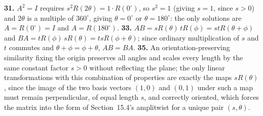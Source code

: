 \quad
\textbf{31.} $A^2=I$ requires $s^2R(2\theta) = 1\cdot R(0^\circ)$, so
$s^2=1$ (giving $s=1$, since $s>0$) and $2\theta$ is a multiple of
$360^\circ$, giving $\theta=0^\circ$ or $\theta=180^\circ$: the only
solutions are $A=R(0^\circ)=I$ and $A=R(180^\circ)$. \quad
\textbf{33.} $AB = sR(\theta)\,tR(\phi) = stR(\theta+\phi)$ and $BA =
tR(\phi)\,sR(\theta) = tsR(\phi+\theta)$; since ordinary multiplication
of $s$ and $t$ commutes and $\theta+\phi=\phi+\theta$, $AB=BA$. \quad
\textbf{35.} An orientation-preserving similarity fixing the origin
preserves all angles and scales every length by the same constant
factor $s>0$ without reflecting the plane; the only linear
transformations with this combination of properties are exactly the
maps $sR(\theta)$, since the image of the two basis vectors $(1,0)$ and
$(0,1)$ under such a map must remain perpendicular, of equal length
$s$, and correctly oriented, which forces the matrix into the form of
Section~15.4's amplitwist for a unique pair $(s,\theta)$.

